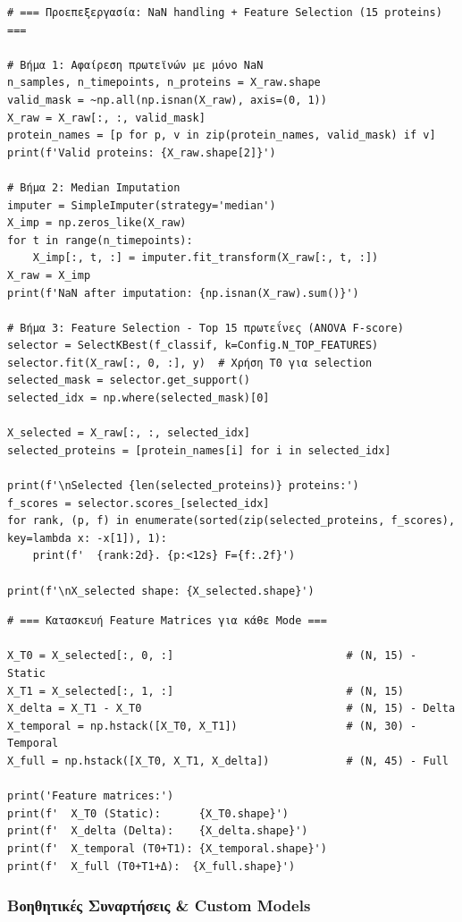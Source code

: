 \begin{lstlisting}
# === Προεπεξεργασία: NaN handling + Feature Selection (15 proteins) ===
 
# Βήμα 1: Αφαίρεση πρωτεϊνών με μόνο NaN
n_samples, n_timepoints, n_proteins = X_raw.shape
valid_mask = ~np.all(np.isnan(X_raw), axis=(0, 1))
X_raw = X_raw[:, :, valid_mask]
protein_names = [p for p, v in zip(protein_names, valid_mask) if v]
print(f'Valid proteins: {X_raw.shape[2]}')
 
# Βήμα 2: Median Imputation
imputer = SimpleImputer(strategy='median')
X_imp = np.zeros_like(X_raw)
for t in range(n_timepoints):
    X_imp[:, t, :] = imputer.fit_transform(X_raw[:, t, :])
X_raw = X_imp
print(f'NaN after imputation: {np.isnan(X_raw).sum()}')
 
# Βήμα 3: Feature Selection - Top 15 πρωτεΐνες (ANOVA F-score)
selector = SelectKBest(f_classif, k=Config.N_TOP_FEATURES)
selector.fit(X_raw[:, 0, :], y)  # Χρήση T0 για selection
selected_mask = selector.get_support()
selected_idx = np.where(selected_mask)[0]
 
X_selected = X_raw[:, :, selected_idx]
selected_proteins = [protein_names[i] for i in selected_idx]
 
print(f'\nSelected {len(selected_proteins)} proteins:')
f_scores = selector.scores_[selected_idx]
for rank, (p, f) in enumerate(sorted(zip(selected_proteins, f_scores), key=lambda x: -x[1]), 1):
    print(f'  {rank:2d}. {p:<12s} F={f:.2f}')
 
print(f'\nX_selected shape: {X_selected.shape}')
\end{lstlisting}
 
\begin{lstlisting}
# === Κατασκευή Feature Matrices για κάθε Mode ===
 
X_T0 = X_selected[:, 0, :]                           # (N, 15) - Static
X_T1 = X_selected[:, 1, :]                           # (N, 15)
X_delta = X_T1 - X_T0                                # (N, 15) - Delta
X_temporal = np.hstack([X_T0, X_T1])                 # (N, 30) - Temporal
X_full = np.hstack([X_T0, X_T1, X_delta])            # (N, 45) - Full
 
print('Feature matrices:')
print(f'  X_T0 (Static):      {X_T0.shape}')
print(f'  X_delta (Delta):    {X_delta.shape}')
print(f'  X_temporal (T0+T1): {X_temporal.shape}')
print(f'  X_full (T0+T1+Δ):  {X_full.shape}')
\end{lstlisting}
 
\subsubsection*{Βοηθητικές Συναρτήσεις \& Custom Models}
 
